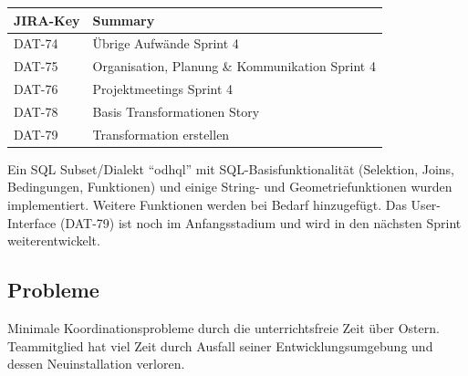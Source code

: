 \begin{table}[H]	
\centering
\begin{tabular}{ll}
	\toprule
	\textbf{JIRA-Key} & \textbf{Summary}\\
	\midrule
DAT-74 & Übrige Aufwände Sprint 4\\
DAT-75 & Organisation, Planung \& Kommunikation Sprint 4\\
DAT-76 & Projektmeetings Sprint 4\\
DAT-78 & Basis Transformationen	Story\\
DAT-79 & Transformation erstellen\\
	\bottomrule
\end{tabular}	
\end{table}

Ein SQL Subset/Dialekt ``\acs{odhql}'' mit SQL-Basisfunktionalität (Selektion, Joins, Bedingungen, Funktionen) und einige String- und Geometriefunktionen wurden implementiert. Weitere Funktionen werden bei Bedarf hinzugefügt. Das User-Interface (DAT-79) ist noch im Anfangsstadium und wird in den nächsten Sprint weiterentwickelt.

\subsection*{Probleme}
Minimale Koordinationsprobleme durch die unterrichtsfreie Zeit über Ostern. Teammitglied \rlif hat viel Zeit durch Ausfall seiner Entwicklungsumgebung und dessen Neuinstallation verloren.
